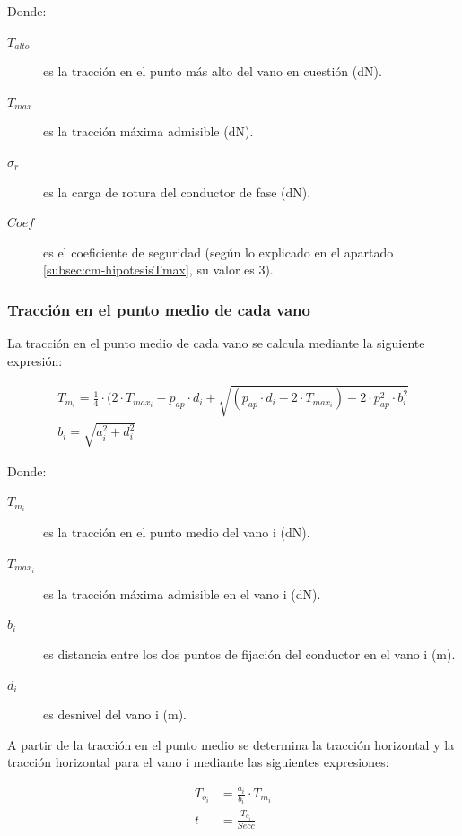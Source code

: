 Donde:
\begin{description}
  \item[$T_{alto}$] es la tracción en el punto más alto del vano en cuestión (\si{\deca\newton}).
  \item[$T_{max}$] es la tracción máxima admisible (\si{\deca\newton}).
  \item[$\sigma_r$] es la carga de rotura del conductor de fase (\si{\deca\newton}).
  \item[$Coef$] es el coeficiente de seguridad (según lo explicado en el apartado \ref{subsec:cm-hipotesisTmax}, su valor es 3).
\end{description}

\subsubsection{Tracción en el punto medio de cada vano}
\label{subsubsec:hipotesisTmax-Tmed}
La tracción en el punto medio de cada vano se calcula mediante la siguiente expresión:

\begin{gather}
    T_{m_i} = \frac{1}{4} \cdot (2 \cdot T_{max_i} - p_{ap} \cdot d_i + \sqrt{(p_{ap} \cdot d_i - 2 \cdot T_{max_i}) - 2 \cdot p_{ap}^2 \cdot b_i^2}
    \label{eq:Tm} \\[0.5em]
    b_i = \sqrt{a_i^2 + d_i^2}
    \label{eq:bi-desnivel}
\end{gather}

Donde:
\begin{description}
  \item[$T_{m_i}$] es la tracción en el punto medio del vano i (\si{\deca\newton}).
  \item[$T_{max_i}$] es la tracción máxima admisible en el vano i (\si{\deca\newton}).
  \item[$b_i$] es distancia entre los dos puntos de fijación del conductor en el vano i (\si{\meter}).
  \item[$d_i$] es desnivel del vano i (\si{\meter}).
\end{description}

A partir de la tracción en el punto medio se determina la tracción horizontal y la tracción horizontal para el vano i mediante las siguientes expresiones:

\begin{align}
    T_{o_i} &= \frac{a_i}{b_i} \cdot T_{m_i}
    \label{eq:To} \\[0.5em]
    t &= \frac{T_{o_i}}{Secc}
\end{align}

